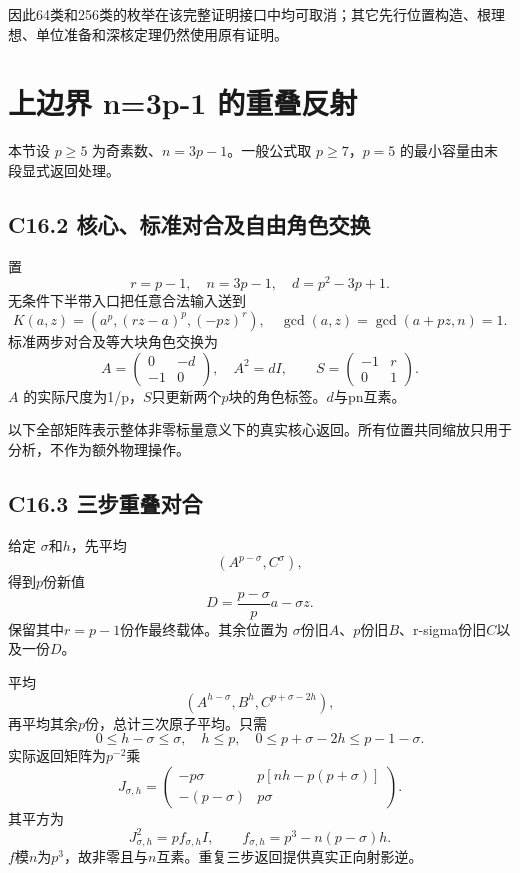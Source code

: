 \documentclass[11pt,a4paper]{article}
\theoremstyle{definition}
\numberwithin{equation}{section}
\begin{document}
{因此64类和256类的枚举在该完整证明接口中均可取消；其它先行位置构造、根理想、单位准备和深核定理仍然使用原有证明。}


\section{上边界 n=3p-1 的重叠反射}\label{construct:r-last}
{本节设} \(p\ge5\) {为奇素数、}\(n=3p-1\){。一般公式取} \(p\ge7\){，}\(p=5\) {的最小容量由末段显式返回处理。}

\subsection*{\texorpdfstring{{C16.2} {核心、标准对合及自由角色交换}}{C16.2 核心、标准对合及自由角色交换}}\label{C16-h114}

{置} \[
r=p-1,\quad n=3p-1,\quad d=p^2-3p+1.
\] {无条件下半带入口把任意合法输入送到} \[
K(a,z)=(a^p,(rz-a)^p,(-pz)^r),
\quad \gcd(a,z)=\gcd(a+pz,n)=1.
\tag{C16.2.1}
\] {标准两步对合及等大块角色交换为} \[
A=\begin{pmatrix}0&-d\\-1&0\end{pmatrix},
\quad A^2=dI,\qquad
S=\begin{pmatrix}-1&r\\0&1\end{pmatrix}.
\tag{C16.2.2}
\] {\ensuremath{A}} {的实际尺度为1/p，\ensuremath{S}只更新两个\ensuremath{p}块的角色标签。\ensuremath{d}与pn互素。}

{以下全部矩阵表示整体非零标量意义下的真实核心返回。所有位置共同缩放只用于分析，不作为额外物理操作。}

\subsection*{\texorpdfstring{{C16.3} {三步重叠对合}}{C16.3 三步重叠对合}}\label{C16-h115}

{给定} {\ensuremath{\sigma }和\ensuremath{h}，先平均} \[
(A^{p-\sigma},C^\sigma),
\] {得到\ensuremath{p}份新值} \[
D=\frac{p-\sigma}{p}a-\sigma z.
\] {保留其中\ensuremath{r=p-1}份作最终载体。其余位置为} {\ensuremath{\sigma }份旧\ensuremath{A}、\ensuremath{p}份旧\ensuremath{B}、r-sigma份旧\ensuremath{C}以及一份\ensuremath{D}。}

{平均} \[
(A^{h-\sigma},B^h,C^{p+\sigma-2h}),
\] {再平均其余\ensuremath{p}份，总计三次原子平均。只需} \[
0\le h-\sigma\le\sigma,\quad h\le p,\quad
0\le p+\sigma-2h\le p-1-\sigma.
\tag{C16.3.1}
\] {实际返回矩阵为\ensuremath{p^{-2}}乘} \[
J_{\sigma,h}=
\begin{pmatrix}
-p\sigma&p[nh-p(p+\sigma)]\\
-(p-\sigma)&p\sigma
\end{pmatrix}.
\] {其平方为} \[
\boxed{J_{\sigma,h}^2=p f_{\sigma,h}I,\qquad
f_{\sigma,h}=p^3-n(p-\sigma)h.}
\tag{C16.3.2}
\] {\ensuremath{f}模\ensuremath{n}为\ensuremath{p^{3}}，故非零且与\ensuremath{n}互素。重复三步返回提供真实正向射影逆。}
\end{document}

